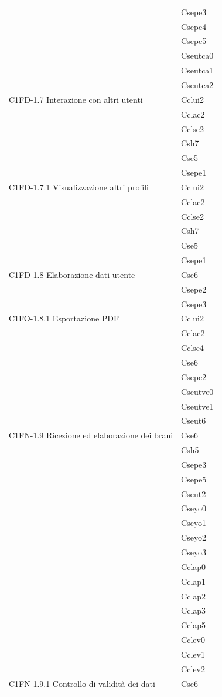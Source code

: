 \begin{footnotesize}
\begin{longtable}[!h]{|l|l|}
& Csepe3\\
& Csepe4\\
& Csepe5\\
& Cseutca0\\
& Cseutca1\\
& Cseutca2\\\hline  
C1FD-1.7 Interazione con altri utenti & Cclui2\\
& Cclac2\\
& Cclse2\\
& Csh7\\
& Cse5\\
& Csepe1\\\hline     
C1FD-1.7.1 Visualizzazione altri profili & Cclui2\\
& Cclac2\\
& Cclse2\\
& Csh7\\
& Cse5\\
& Csepe1\\\hline  
C1FD-1.8 Elaborazione dati utente & Cse6\\
& Csepe2\\
& Csepe3\\\hline   
C1FO-1.8.1 Esportazione PDF & Cclui2\\
& Cclac2\\
& Cclse4\\
& Cse6\\
& Csepe2\\
& Cseutve0\\
& Cseutve1\\
& Cseut6\\\hline  
C1FN-1.9 Ricezione ed elaborazione dei brani & Cse6\\
& Csh5\\
& Csepe3\\
& Csepe5\\
& Cseut2\\
& Cseyo0\\
& Cseyo1\\
& Cseyo2\\
& Cseyo3\\
& Cclap0\\
& Cclap1\\
& Cclap2\\
& Cclap3\\
& Cclap5\\
& Cclev0\\
& Cclev1\\
& Cclev2\\\hline  
C1FN-1.9.1 Controllo di validit\`a dei dati & Cse6\\

\end{longtable}
\end{footnotesize}
